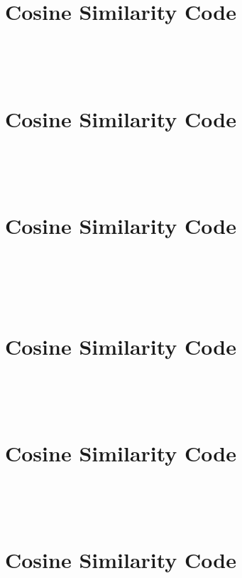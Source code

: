 \documentclass{article}
\begin{document}
\section*{Cosine Similarity Code}
\begin{lstlisting}[language=Java, caption=Cosine Similarity Implementation]

\end{lstlisting}\\
\\
\section*{Cosine Similarity Code}
\begin{lstlisting}[language=Java, caption=Cosine Similarity Implementation]

\end{lstlisting}\\
\\
\section*{Cosine Similarity Code}
\begin{lstlisting}[language=Java, caption=Cosine Similarity Implementation]

\end{lstlisting}\\
\\
\\
\section*{Cosine Similarity Code}
\begin{lstlisting}[language=Java, caption=Cosine Similarity Implementation]

\end{lstlisting}\\
\\
\section*{Cosine Similarity Code}
\begin{lstlisting}[language=Java, caption=Cosine Similarity Implementation]

\end{lstlisting}\\
\\
\section*{Cosine Similarity Code}
\begin{lstlisting}[language=Java, caption=Cosine Similarity Implementation]

\end{lstlisting}\\
\end{document}
